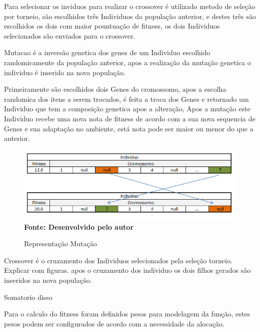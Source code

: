 \documentclass{abntpuc}
\begin{document}
Para selecionar os inviduos para realizar o crossover é utilizado metodo de seleção por torneio, são escolhidos três Individuos da população anterior, e destes três são escolhidos os dois com maior pountuação de fitness, os dois Individuos selecionados são enviados para o crossover.\par

Mutacao é a inversão genetica dos genes de um Individuo escolhido randomicamente da população anterior, apos a realização da mutação genetica o individuo é inserido na nova população.\par

Primeiramente são escolhidos dois Genes do cromossomo, apos a escolha randomica dos itens a serem trocados, é feita a troca dos Genes e retornado um Individuo que tem a composição genetica apos a alteração, Apos a mutação este Individuo recebe uma nova nota de fitness de acordo com a sua nova sequencia de Genes e sua adaptação no ambiente, está nota pode ser maior ou menor do que a anterior.\par

\begin{figure}[!htb]
\caption[Representação Mutação]{Representação Mutação}
\label{fig:figura8}
\centering
\includegraphics[scale=0.7]{imagens/representacaoMutacao.png}
\\ \textbf{\footnotesize Fonte: Desenvolvido pelo autor}
\end{figure}

Crossover é o cruzamento dos Individuos selecionados pela seleção torneio. Explicar com figuras. apos o cruzamento dos individuo os dois filhos gerados são inseridos na nova população.\par






Somatorio disso

Para o calculo do fitness foram definidos pesos para modelagem da função, estes pesos podem ser configurados de acordo com a necessidade da alocação.
\end{document}
